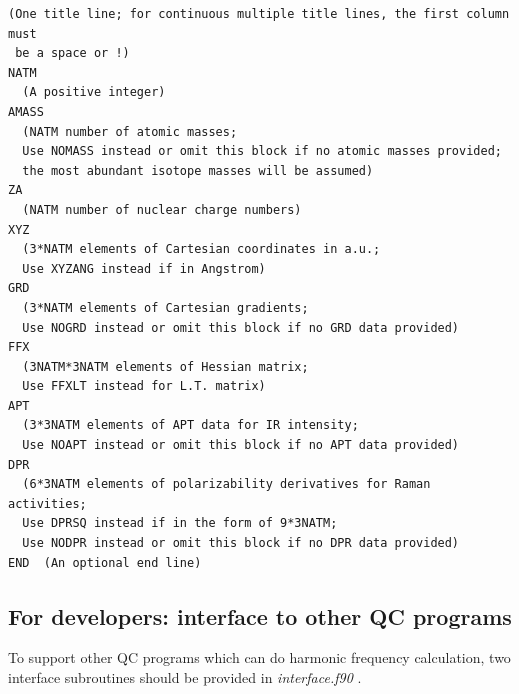 \documentclass[12pt,english]{extarticle}
\begin{document}
\begin{Verbatim}[frame=single,label=Format(Ver.1.2.0 2023.01.19),labelposition=topline,rulecolor=\color{blue},fontsize=\small,baselinestretch=1.0]
(One title line; for continuous multiple title lines, the first column must
 be a space or !)
NATM
  (A positive integer)
AMASS
  (NATM number of atomic masses;
  Use NOMASS instead or omit this block if no atomic masses provided;
  the most abundant isotope masses will be assumed)
ZA
  (NATM number of nuclear charge numbers)
XYZ
  (3*NATM elements of Cartesian coordinates in a.u.;
  Use XYZANG instead if in Angstrom)
GRD
  (3*NATM elements of Cartesian gradients;
  Use NOGRD instead or omit this block if no GRD data provided)
FFX
  (3NATM*3NATM elements of Hessian matrix;
  Use FFXLT instead for L.T. matrix)
APT
  (3*3NATM elements of APT data for IR intensity;
  Use NOAPT instead or omit this block if no APT data provided)
DPR
  (6*3NATM elements of polarizability derivatives for Raman activities;
  Use DPRSQ instead if in the form of 9*3NATM;
  Use NODPR instead or omit this block if no DPR data provided)
END  (An optional end line)
\end{Verbatim}

\pagebreak{}

\subsection{For developers: interface to other QC programs} \label{sec:interface}

To support other QC programs which can do harmonic frequency calculation, two interface subroutines should be provided in \emph{interface.f90} .
\end{document}

